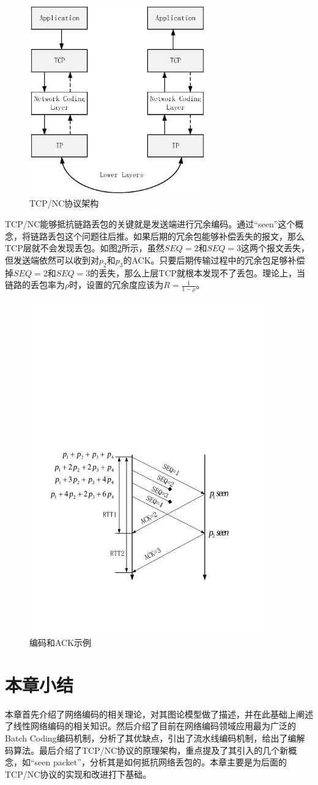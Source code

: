 \begin{figure}[htbp]
	\centering
	\includegraphics[width=3in]{figures/tcpnc.eps}
	\caption{TCP/NC协议架构}
	\label{TCPNC_EPS}
\end{figure}
\par
TCP/NC能够抵抗链路丢包的关键就是发送端进行冗余编码。通过“seen”这个概念，将链路丢包这个问题往后推。如果后期的冗余包能够补偿丢失的报文，那么TCP层就不会发现丢包。如图\ref{CODINGACK_EPS}所示，虽然$SEQ=2$和$SEQ=3$这两个报文丢失，但发送端依然可以收到对$p_{2}$和$p_{3}$的ACK。只要后期传输过程中的冗余包足够补偿掉$SEQ=2$和$SEQ=3$的丢失，那么上层TCP就根本发现不了丢包。理论上，当链路的丢包率为$\rho$时，设置的冗余度应该为$R=\frac{1}{1-\rho}$。
\begin{figure}[htbp]
	\centering
	\includegraphics[width=4in]{figures/codingack.pdf}
	\caption{编码和ACK示例}
	\label{CODINGACK_EPS}
\end{figure}
\section{本章小结}
本章首先介绍了网络编码的相关理论，对其图论模型做了描述，并在此基础上阐述了线性网络编码的相关知识。然后介绍了目前在网络编码领域应用最为广泛的Batch Coding编码机制，分析了其优缺点，引出了流水线编码机制，给出了编解码算法。最后介绍了TCP/NC协议的原理架构，重点提及了其引入的几个新概念，如“seen packet”，分析其是如何抵抗网络丢包的。本章主要是为后面的TCP/NC协议的实现和改进打下基础。 
